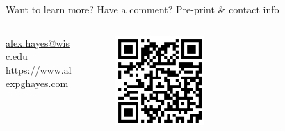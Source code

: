 \documentclass[final]{beamer}
\newlength{\sepwidth}
\newlength{\colwidth}
\newcommand{\separatorcolumn}{\begin{column}{\sepwidth}\end{column}}
\begin{document}
\begin{frame}[t]
\begin{columns}[t]
\begin{column}{\colwidth}
\begin{block}{Want to learn more? Have a comment? Pre-print \& contact info}
                \begin{columns}
                    \begin{column}{0.4\textwidth}
                        \begin{center}
                            \url{alex.hayes@wisc.edu} \\
                            \url{https://www.alexpghayes.com}
                        \end{center}
                    \end{column}
                    \begin{column}{0.3\textwidth}
                        \begin{figure}
                            \centering
                            \includegraphics[width=0.45\textwidth]{./figures/arxiv-qr.png}
                        \end{figure}
                    \end{column}
                \end{columns}
            \end{block}
        \end{column}
        \separatorcolumn
    \end{columns}
\end{frame}
\end{document}
